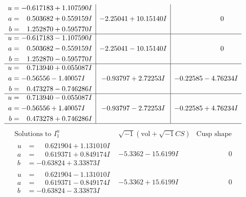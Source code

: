\documentclass[1p]{elsarticle_modified}
\theoremstyle{definition}
\newcommand{\I}{\sqrt{-1}}
\begin{document}
$$\begin{array}{c|c|c}
\begin{aligned}
u &= -0.617183 + 1.107590 I \\
a &= \phantom{-}0.503682 + 0.559159 I \\
b &= \phantom{-}1.252870 + 0.595770 I\end{aligned}
 & -2.25041 + 10.15140 I & \phantom{-0.000000 } 0 \\ \hline\begin{aligned}
u &= -0.617183 - 1.107590 I \\
a &= \phantom{-}0.503682 - 0.559159 I \\
b &= \phantom{-}1.252870 - 0.595770 I\end{aligned}
 & -2.25041 - 10.15140 I & \phantom{-0.000000 } 0 \\ \hline\begin{aligned}
u &= \phantom{-}0.713940 + 0.055087 I \\
a &= -0.56556 - 1.40057 I \\
b &= \phantom{-}0.473278 - 0.746286 I\end{aligned}
 & -0.93797 + 2.72253 I & -0.22585 - 4.76234 I \\ \hline\begin{aligned}
u &= \phantom{-}0.713940 - 0.055087 I \\
a &= -0.56556 + 1.40057 I \\
b &= \phantom{-}0.473278 + 0.746286 I\end{aligned}
 & -0.93797 - 2.72253 I & -0.22585 + 4.76234 I\\
 \hline 
 \end{array}$$\newpage$$\begin{array}{c|c|c}  
\text{Solutions to }I^u_{1}& \I (\text{vol} + \sqrt{-1}CS) & \text{Cusp shape}\\
 \hline 
\begin{aligned}
u &= \phantom{-}0.621904 + 1.131010 I \\
a &= \phantom{-}0.619371 + 0.849174 I \\
b &= -0.63824 + 3.33873 I\end{aligned}
 & -5.3362 - 15.6199 I & \phantom{-0.000000 } 0 \\ \hline\begin{aligned}
u &= \phantom{-}0.621904 - 1.131010 I \\
a &= \phantom{-}0.619371 - 0.849174 I \\
b &= -0.63824 - 3.33873 I\end{aligned}
 & -5.3362 + 15.6199 I & \phantom{-0.000000 } 0 \\ \hline\begin{aligned}

\end{aligned}
\end{array}$$
\end{document}
